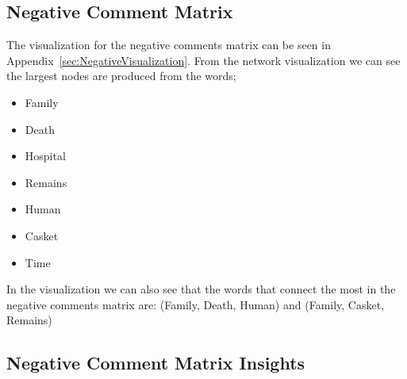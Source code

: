 \documentclass{article}
\begin{document}
\subsection{Negative Comment Matrix}
The visualization for the negative comments matrix can be seen in Appendix~\ref{sec:NegativeVisualization}. From the network visualization we can see the largest nodes are produced from the words;
\begin{itemize}
    \item Family
    \item Death
    \item Hospital
    \item Remains
    \item Human
    \item Casket
    \item Time
\end{itemize}

In the visualization we can also see that the words that connect the most in the negative comments matrix are: (Family, Death, Human) and (Family, Casket, Remains)

\subsection{Negative Comment Matrix Insights}
\end{document}
